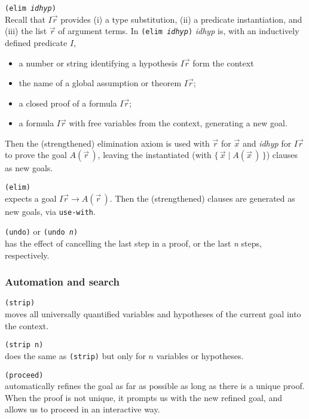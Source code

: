 \documentclass[12pt]{amsart}
\newcommand{\set}[2]{\{\,#1\mid#2\,\}}
\begin{document}
\begin{appendix}
\texttt{(elim \textsl{idhyp})}\\
Recall that $I \vec{r}$ provides (i) a type substitution, (ii) a
predicate instantiation, and (iii) the list $\vec{r}$ of argument
terms.  In \texttt{(elim \textsl{idhyp})}
\textsl{idhyp} is, with an inductively defined predicate $I$,
\begin{itemize}
\item a number or string identifying a hypothesis $I \vec{r}$ form the
  context
\item the name of a global assumption or theorem $I \vec{r}$;
\item a closed proof of a formula $I \vec{r}$;
\item a formula $I \vec{r}$ with free variables from the context,
  generating a new goal.
\end{itemize}
Then the (strengthened) elimination axiom is used with $\vec{r}$ for
$\vec{x}$ and \textsl{idhyp} for $I \vec{r}$ to prove the goal
$A(\vec{r}\,)$, leaving the instantiated (with $\set {\vec{x}}
{A(\vec{x}\,)}$) clauses as new goals.

\texttt{(elim)}\\
expects a goal $I \vec{r} \to A(\vec{r}\,)$.  Then the (strengthened)
clauses are generated as new goals, via \texttt{use-with}.

\texttt{(undo)}
or \texttt{(undo \textsl{n})}\\
has the effect of cancelling the last step in a proof, or the
last  \textsl{n} steps, respectively.


\subsubsection{Automation and search}\quad

\texttt{(strip)}\\
moves all universally quantified variables
and hypotheses of the current goal into the context.

\texttt{(strip n)}\\
does the same as \texttt{(strip)}
but only for $n$ variables or hypotheses.

\texttt{(proceed)}\\
automatically refines the goal as far as possible as long as there is
a unique proof.  When the proof is not unique, it prompts us with the
new refined goal, and allows us to proceed in an
interactive way.


\end{appendix}
\end{document}
